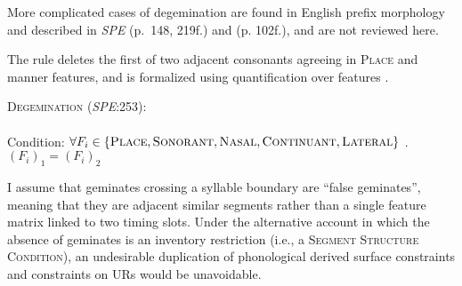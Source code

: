 More complicated cases of degemination are found in English prefix morphology and described in \emph{SPE} (p.~148, 219f.) and \citealt[][]{Borowsky1986} (p. 102f.), and are not reviewed here.


The rule deletes the first of two adjacent consonants agreeing in \textsc{Place} and manner features, and is formalized using quantification over features \citep{Reiss2003b}.

\ex \textsc{Degemination} (\emph{SPE}:253): \\
\label{degem}
\\ 
Condition: $\forall F_i \in \{\textsc{Place}, \textsc{Sonorant}, \textsc{Nasal}, \textsc{Continuant}, \textsc{Lateral}\}$ . $(F_i)_1 = (F_i)_2$
\xe

\noindent
I assume that geminates crossing a syllable boundary are ``false geminates'', meaning that they are adjacent similar segments rather than a single feature matrix linked to two timing slots. Under the alternative account in which the absence of geminates is an inventory restriction (i.e., a \textsc{Segment Structure Condition}), an undesirable duplication of phonological derived surface constraints and constraints on URs would be unavoidable.

